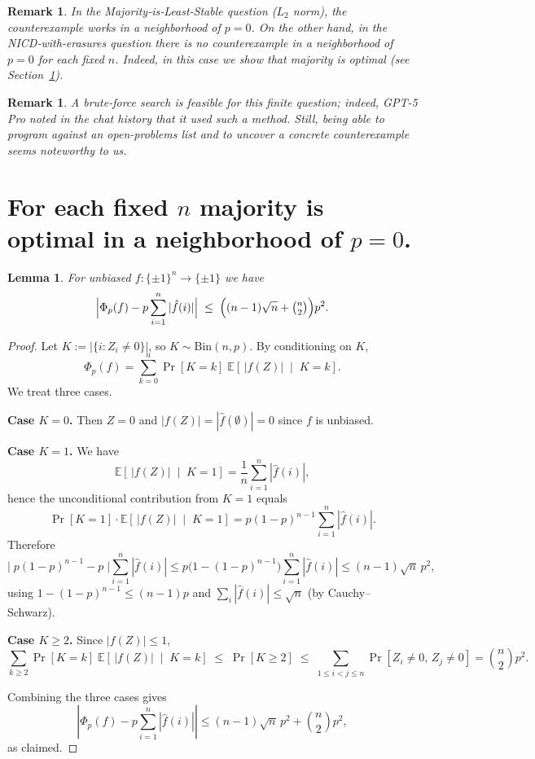 \documentclass[11pt]{article}
\newtheorem{remark}[theorem]{Remark}
\newtheorem{lemma}[theorem]{Lemma}
\begin{document}
\begin{remark}
In the Majority‑is‑Least‑Stable question (\(L_2\) norm), the counterexample works in a neighborhood of $p=0$. On the other hand, in the NICD‑with‑erasures question there is no counterexample in a neighborhood of $p=0$ for each fixed $n$. Indeed, in this case we show that majority is optimal (see Section~\ref{majopt1}).
\end{remark}

\begin{remark}
A brute-force search is feasible for this finite question; indeed, GPT-5 Pro noted in the chat history that it used such a method. Still, being able to program against an open-problems list and to uncover a concrete counterexample seems noteworthy to us.
\end{remark}

\section{For each fixed $n$ majority is optimal in a neighborhood of $p=0$.}\label{majopt1}

\begin{lemma}\label{lemma1}
For unbiased $f:\{\pm1\}^n\to\{\pm1\}$ we have
\[
\Bigl|\Phi_p(f)-p\sum_{i=1}^n|\hat f(i)|\Bigr|
\;\le\; \Bigl((n-1)\sqrt n+\tbinom{n}{2}\Bigr)p^2.
\]
\end{lemma}

\begin{proof}
Let $K:=|\{i:Z_i\neq 0\}|$, so $K\sim\mathrm{Bin}(n,p)$. By conditioning on $K$,
\[
\Phi_p(f)=\sum_{k=0}^n \Pr[K=k]\;\mathbb E\!\left[\,|f(Z)|\;\middle|\;K=k\right].
\]
We treat three cases.

\medskip
\noindent\textbf{Case \(K=0\).} Then $Z=0$ and $|f(Z)|=|\hat f(\emptyset)|=0$ since $f$ is unbiased.

\medskip
\noindent\textbf{Case \(K=1\).} We have
\[
\mathbb E\!\left[\,|f(Z)|\;\middle|\;K=1\right]
=\frac{1}{n}\sum_{i=1}^n |\hat f(i)|,
\]
hence the unconditional contribution from $K=1$ equals
\[
\Pr[K=1]\cdot \mathbb E\!\left[\,|f(Z)|\;\middle|\;K=1\right]
= p(1-p)^{n-1}\sum_{i=1}^n |\hat f(i)|.
\]
Therefore
\[
\bigl|\;p(1-p)^{n-1}-p\;\bigr|\sum_{i=1}^n|\hat f(i)|
\le p\bigl(1-(1-p)^{n-1}\bigr)\sum_{i=1}^n|\hat f(i)|
\le (n-1)\sqrt{n}\,p^2,
\]
using $1-(1-p)^{n-1}\le (n-1)p$ and $\sum_i|\hat f(i)|\le \sqrt n$ (by Cauchy--Schwarz).

\medskip
\noindent\textbf{Case \(K\ge2\).} Since $|f(Z)|\le 1$,
\[
\sum_{k\ge2}\Pr[K=k]\;\mathbb E\!\left[\,|f(Z)|\;\middle|\;K=k\right]
\;\le\;\Pr[K\ge2]
\;\le\; \sum_{1\le i<j\le n}\Pr[Z_i\neq 0,\,Z_j\neq 0]
=\binom{n}{2}p^2.
\]

\medskip
Combining the three cases gives
\[
\left|\Phi_p(f)-p\sum_{i=1}^n|\hat f(i)|\right|
\le (n-1)\sqrt n\,p^2+\binom{n}{2}p^2,
\]
as claimed.
\end{proof}
\end{document}
